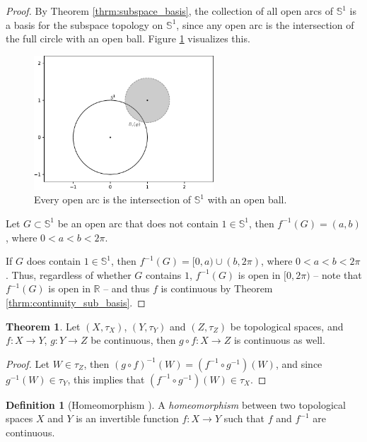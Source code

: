 \documentclass[12pt, a4paper]{article}
\numberwithin{equation}{section}
\theoremstyle{definition}
\theoremstyle{definition}
\newtheorem{defn}[thm]{Definition} %
\newtheorem{theorem}[thm]{Theorem}
\begin{document}
		\begin{proof}
			By Theorem \ref{thrm:subspace_basis}, the collection of all open arcs of $\mathbb S^1$ is a basis for the subspace topology on $\mathbb S^1$, since any open arc is the intersection of the full circle with an open ball. Figure \ref{fig:open_arc} visualizes this.
			\begin{figure}[h]
				\centering
				\includegraphics[width=0.6\textwidth]{Figures/circles_intersection_arc.pdf}
				\caption{Every open arc is the intersection of $\mathbb S^1$ with an open ball.}
				\label{fig:open_arc}
			\end{figure}
			
			Let $G\subset \mathbb S^1$ be an open arc that does not contain $1\in \mathbb S^1$, then $f^{-1}(G) = (a, b)$, where $0 < a < b < 2\pi$. 
			
			If $G$ does contain $1\in\mathbb S^1$, then $f^{-1}(G) = [0, a) \cup (b, 2\pi)$, where $0 < a < b < 2\pi$. Thus, regardless of whether $G$ contains $1$, $f^{-1}(G)$ is open in $[0, 2\pi)$ -- note that $f^{-1}(G)$ is open in $\mathbb R$ -- and thus $f$ is continuous by Theorem \ref{thrm:continuity_sub_basis}.
		\end{proof}
	
		\begin{theorem}\label{thrm:composition_continuous_functions}
			Let $(X, \tau_X)$, $(Y, \tau_Y)$ and $(Z, \tau_Z)$ be topological spaces, and $f: X\to Y$, $g: Y\to Z$ be continuous, then $g\circ f: X\to Z$ is continuous as well.
		\end{theorem}
	
		\begin{proof}
			Let $W\in\tau_Z$, then $(g\circ f)^{-1}(W) = (f^{-1}\circ g^{-1})(W)$, and since $g^{-1}(W)\in \tau_Y$, this implies that $(f^{-1}\circ g^{-1})(W)\in\tau_X$.
		\end{proof}
				
		\begin{defn}[Homeomorphism \cite{topology-singh}] A \textit{homeomorphism} between two topological spaces $X$ and $Y$ is an invertible function $f: X\rightarrow Y$ such that $f$ and $f^{-1}$ are continuous. 
		\end{defn}
		
\end{document}
